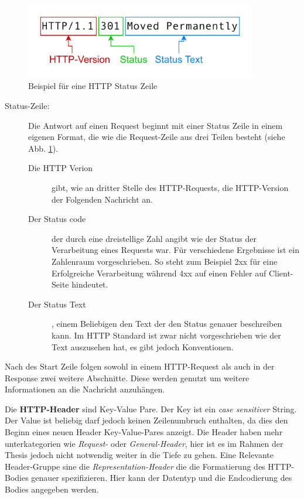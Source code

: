 \begin{figure}[!hbt]
     \centering
     \includegraphics[width=0.9\textwidth]{./images/HTTP-Statusline.png}
     \caption{Beispiel für eine HTTP Status Zeile}
     \label{fig:http-statusline}
 \end{figure}


\begin{description}
     \item[Status-Zeile:] Die Antwort auf einen Request beginnt mit einer Status Zeile in einem eigenen Format, die wie die Request-Zeile aus drei Teilen besteht (siehe Abb. \ref{fig:http-statusline}).
     \begin{description}
          \item[Die HTTP Verion] gibt, wie an dritter Stelle des HTTP-Requests, die HTTP-Version der Folgenden Nachricht an.
          \item[Der Status code] der durch eine dreistellige Zahl angibt wie der Status der Verarbeitung eines Requests war. 
          Für verschiedene Ergebnisse ist ein Zahlenraum vorgeschrieben. 
          So steht zum Beispiel 2xx für eine Erfolgreiche Verarbeitung während 4xx auf einen Fehler auf Client-Seite hindeutet.
          \item[Der Status Text], einem Beliebigen den Text der den Status genauer beschreiben kann.
          Im HTTP Standard ist zwar nicht vorgeschrieben wie der Text auszusehen hat, es gibt jedoch Konventionen.
     \end{description}
\end{description}

Nach des Start Zeile folgen sowohl in einem HTTP-Request als auch in der Response zwei weitere Abschnitte. Diese werden genutzt um weitere Informationen an die Nachricht anzuhängen.

Die \textbf{HTTP-Header} sind Key-Value Pare. Der Key ist ein \textit{case sensitiver} String.
Der Value ist beliebig darf jedoch keinen Zeilenumbruch enthalten, da dies den Beginn eines neuen Header Key-Value-Pares anzeigt.
Die Header haben mehr unterkategorien wie \textit{Request-} oder \textit{General-Header}, hier ist es im Rahmen der Thesis jedoch nicht notwendig weiter in die Tiefe zu gehen.
Eine Relevante Header-Gruppe sine die \textit{Representation-Header} die die Formatierung des HTTP-Bodies genauer spezifizieren.
Hier kann der Datentyp und die Endcodierung des Bodies angegeben werden.

